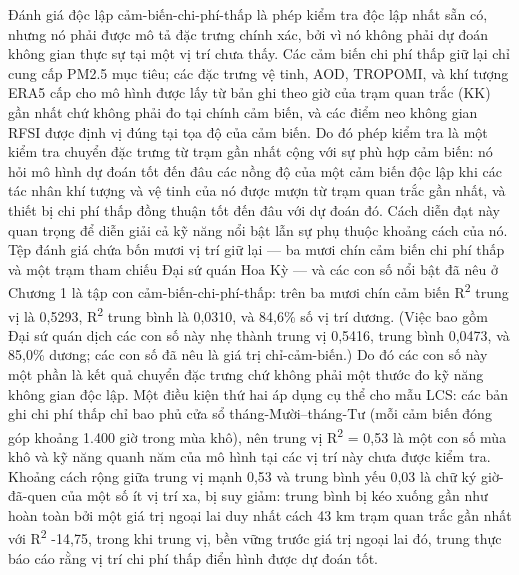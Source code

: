 Đánh giá độc lập cảm-biến-chi-phí-thấp là phép kiểm tra độc lập nhất sẵn có, nhưng nó phải được mô tả đặc trưng chính xác, bởi vì nó không phải dự đoán không gian thực sự tại một vị trí chưa thấy. Các cảm biến chi phí thấp giữ lại chỉ cung cấp PM2.5 mục tiêu; các đặc trưng vệ tinh, AOD, TROPOMI, và khí tượng ERA5 cấp cho mô hình được lấy từ bản ghi theo giờ của trạm quan trắc (KK) gần nhất chứ không phải đo tại chính cảm biến, và các điểm neo không gian RFSI được định vị đúng tại tọa độ của cảm biến. Do đó phép kiểm tra là một kiểm tra chuyển đặc trưng từ trạm gần nhất cộng với sự phù hợp cảm biến: nó hỏi mô hình dự đoán tốt đến đâu các nồng độ của một cảm biến độc lập khi các tác nhân khí tượng và vệ tinh của nó được mượn từ trạm quan trắc gần nhất, và thiết bị chi phí thấp đồng thuận tốt đến đâu với dự đoán đó. Cách diễn đạt này quan trọng để diễn giải cả kỹ năng nổi bật lẫn sự phụ thuộc khoảng cách của nó. Tệp đánh giá chứa bốn mươi vị trí giữ lại --- ba mươi chín cảm biến chi phí thấp và một trạm tham chiếu Đại sứ quán Hoa Kỳ --- và các con số nổi bật đã nêu ở Chương 1 là tập con cảm-biến-chi-phí-thấp: trên ba mươi chín cảm biến R\textsuperscript{2} trung vị là 0,5293, R\textsuperscript{2} trung bình là 0,0310, và 84,6\% số vị trí dương. (Việc bao gồm Đại sứ quán dịch các con số này nhẹ thành trung vị 0,5416, trung bình 0,0473, và 85,0\% dương; các con số đã nêu là giá trị chỉ-cảm-biến.) Do đó các con số này một phần là kết quả chuyển đặc trưng chứ không phải một thước đo kỹ năng không gian độc lập. Một điều kiện thứ hai áp dụng cụ thể cho mẫu LCS: các bản ghi chi phí thấp chỉ bao phủ cửa sổ tháng-Mười--tháng-Tư (mỗi cảm biến đóng góp khoảng 1.400 giờ trong mùa khô), nên trung vị R\textsuperscript{2} = 0,53 là một con số mùa khô và kỹ năng quanh năm của mô hình tại các vị trí này chưa được kiểm tra. Khoảng cách rộng giữa trung vị mạnh 0,53 và trung bình yếu 0,03 là chữ ký giờ-đã-quen của một số ít vị trí xa, bị suy giảm: trung bình bị kéo xuống gần như hoàn toàn bởi một giá trị ngoại lai duy nhất cách 43 km trạm quan trắc gần nhất với R\textsuperscript{2} -14,75, trong khi trung vị, bền vững trước giá trị ngoại lai đó, trung thực báo cáo rằng vị trí chi phí thấp điển hình được dự đoán tốt.


